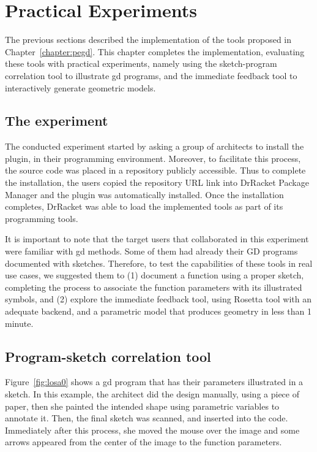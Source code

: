 
\chapter{Practical Experiments}
\label{chapter:experiments}

The previous sections described the implementation of the tools proposed in Chapter~\ref{chapter:pegd}. This chapter completes the implementation, evaluating these tools with practical experiments, namely using the sketch-program correlation tool to illustrate \gls{gd} programs, and the immediate feedback tool to interactively generate geometric models.

\section{The experiment}

The conducted experiment started by asking a group of architects to install the plugin, in their programming environment. Moreover, to facilitate this process, the source code was placed in a repository publicly accessible. Thus to complete the installation, the users copied the repository URL link into DrRacket Package Manager and the plugin was automatically installed. Once the installation completes, DrRacket was able to load the implemented tools as part of its programming tools. 

It is important to note that the target users that collaborated in this experiment were familiar with \gls{gd} methods. Some of them had already their GD programs documented with sketches. Therefore, to test the capabilities of these tools in real use cases, we suggested them to (1) document a function using a proper sketch, completing the process to associate the function parameters with its illustrated symbols, and (2) explore the immediate feedback tool, using Rosetta tool with an adequate backend, and a parametric model that produces geometry in less than 1 minute.

\section{Program-sketch correlation tool}

Figure~\ref{fig:losa0} shows a \gls{gd} program that has their parameters illustrated in a sketch. In this example, the architect did the design manually, using a piece of paper, then she painted the intended shape using parametric variables to annotate it. Then, the final sketch was scanned, and inserted into the code. Immediately after this process, she moved the mouse over the image and some arrows appeared from the center of the image to the  function parameters.

